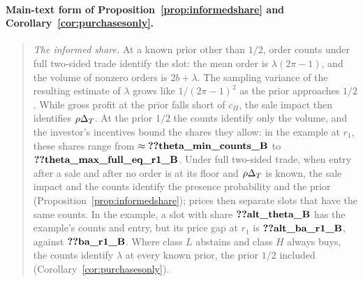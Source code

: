 \paragraph{Main-text form of Proposition~\ref{prop:informedshare} and Corollary~\ref{cor:purchasesonly}.}
\begin{quote}
\emph{The informed share.} At a known prior other than \(1/2\), order counts under full two-sided trade identify the
slot: the mean order is \(\lambda(2\pi-1)\), and the volume of nonzero orders is \(2b+\lambda\). The sampling variance
of the resulting estimate of \(\lambda\) grows like \(1/(2\pi-1)^2\) as the prior approaches \(1/2\). While gross profit at the prior falls short of \(c_H\), the sale impact then
identifies \(\rho\Delta_T\). At the prior \(1/2\) the counts identify only the volume, and the investor's incentives bound
the shares they allow: in the example at \(r_1\), these shares range from \(\approx\reg{theta_min_counts_B}\) to
\(\reg{theta_max_full_eq_r1_B}\). Under full two-sided trade, when entry after a sale and after no order is at its
floor and \(\rho\Delta_T\) is known, the sale impact and the counts identify the presence probability and the prior
(Proposition~\ref{prop:informedshare}); prices then separate slots that have the same counts. In the example, a slot with share \(\reg{alt_theta_B}\) has the
example's counts and entry, but its price gap at \(r_1\) is \(\reg{alt_ba_r1_B}\), against \(\reg{ba_r1_B}\). Where
class \(L\) abstains and class \(H\) always buys, the counts identify \(\lambda\) at every known prior, the prior
\(1/2\) included (Corollary~\ref{cor:purchasesonly}).
\end{quote}

